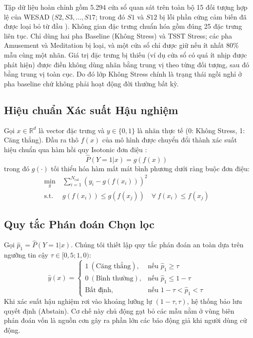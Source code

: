 \documentclass[conference]{IEEEtran}
\begin{document}
Tập dữ liệu hoàn chỉnh gồm 5.294 cửa sổ quan sát trên toàn bộ 15 đối tượng hợp lệ của WESAD ($S2, S3, \dots, S17$; trong đó $S1$ và $S12$ bị lỗi phần cứng cảm biến đã được loại bỏ từ đầu \cite{schmidt2018wesad}). Không gian đặc trưng chuẩn hóa gồm đúng 25 đặc trưng liên tục. Chỉ dùng hai pha Baseline (Không Stress) và TSST Stress; các pha Amusement và Meditation bị loại, và một cửa sổ chỉ được giữ nếu ít nhất 80\% mẫu cùng một nhãn. Giá trị đặc trưng bị thiếu (ví dụ cửa sổ có quá ít nhịp được phát hiện) được điền không dùng nhãn bằng trung vị theo từng đối tượng, sau đó bằng trung vị toàn cục. Do đó lớp Không Stress chính là trạng thái ngồi nghỉ ở pha baseline chứ không phải hoạt động đời thường bất kỳ.

\subsection{Hiệu chuẩn Xác suất Hậu nghiệm}
Gọi $x \in \mathbb{R}^d$ là vector đặc trưng và $y \in \{0, 1\}$ là nhãn thực tế (0: Không Stress, 1: Căng thẳng). Đầu ra thô $f(x)$ của mô hình được chuyển đổi thành xác suất hiệu chuẩn qua hàm hồi quy Isotonic đơn điệu \cite{zadrozny2002transforming, niculescu2005predicting}:
\begin{equation}
\hat{P}(Y=1|x) = g(f(x))
\end{equation}
trong đó $g(\cdot)$ tối thiểu hóa hàm mất mát bình phương dưới ràng buộc đơn điệu:
\begin{equation}
\begin{aligned}
\min_{g} \ & \sum_{i=1}^{N_{\text{cal}}} \left( y_i - g(f(x_i)) \right)^2 \\
\text{s.t.} \ & g(f(x_i)) \le g(f(x_j)) \quad \forall \ f(x_i) \le f(x_j)
\end{aligned}
\end{equation}

\subsection{Quy tắc Phán đoán Chọn lọc}
Gọi $\hat{p}_1 = \hat{P}(Y=1|x)$. Chúng tôi thiết lập quy tắc phán đoán an toàn dựa trên ngưỡng tin cậy $\tau \in [0,5; 1,0)$:
\begin{equation}
\hat{y}(x) =
\begin{cases}
1 \ (\text{Căng thẳng}), & \text{nếu } \hat{p}_1 \ge \tau \\
0 \ (\text{Bình thường}), & \text{nếu } \hat{p}_1 \le 1 - \tau \\
\text{Bất định}, & \text{nếu } 1 - \tau < \hat{p}_1 < \tau
\end{cases}
\end{equation}
Khi xác suất hậu nghiệm rơi vào khoảng lưỡng lự $(1-\tau, \tau)$, hệ thống bảo lưu quyết định (Abstain). Cơ chế này chủ động gạt bỏ các mẫu nằm ở vùng biên phán đoán vốn là nguồn cơn gây ra phần lớn các báo động giả khi người dùng cử động.
\end{document}
